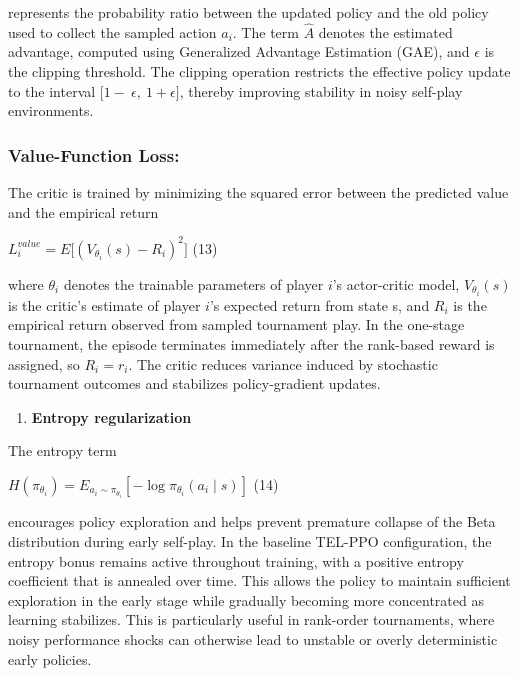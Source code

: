 \documentclass[
]{article}
\begin{document}
represents the probability ratio between the updated policy and the old
policy used to collect the sampled action \(a_{i}\). The term
\(\widehat{A}\) denotes the estimated advantage, computed using
Generalized Advantage Estimation (GAE), and \(\epsilon\) is the clipping
threshold. The clipping operation restricts the effective policy update
to the interval \(\lbrack 1 - \ \epsilon,\ 1 + \epsilon\rbrack\),
thereby improving stability in noisy self-play environments.

\subsubsection{\texorpdfstring{\textbf{Value-Function
Loss:}}{Value-Function Loss:}}\label{value-function-loss}

The critic is trained by minimizing the squared error between the
predicted value and the empirical return

\(L_{i}^{value} = E\lbrack(V_{\theta_{i}}(s) - R_{i})^{2}\rbrack\) (13)

where \(\theta_{i}\) denotes the trainable parameters of player \(i\)'s
actor-critic model, \(V_{\theta_{i}}(s)\) is the critic's estimate of
player \(i\)'s expected return from state s, and \(R_{i}\) is the
empirical return observed from sampled tournament play. In the one-stage
tournament, the episode terminates immediately after the rank-based
reward is assigned, so \(R_{i} = r_{i}\). The critic reduces variance
induced by stochastic tournament outcomes and stabilizes policy-gradient
updates.

\begin{enumerate}
\def\labelenumi{(\alph{enumi})}
\setcounter{enumi}{2}
\item
  \textbf{Entropy regularization}
\end{enumerate}

The entropy term

\(H\left( \pi_{\theta_{i}} \right) = E_{a_{i} \sim \pi_{\theta_{i}}}\left\lbrack - \log\pi_{\theta_{i}}(a_{i} \mid s) \right\rbrack\)
(14)

encourages policy exploration and helps prevent premature collapse of
the Beta distribution during early self-play. In the baseline TEL-PPO
configuration, the entropy bonus remains active throughout training,
with a positive entropy coefficient that is annealed over time. This
allows the policy to maintain sufficient exploration in the early stage
while gradually becoming more concentrated as learning stabilizes. This
is particularly useful in rank-order tournaments, where noisy
performance shocks can otherwise lead to unstable or overly
deterministic early policies.
\end{document}
